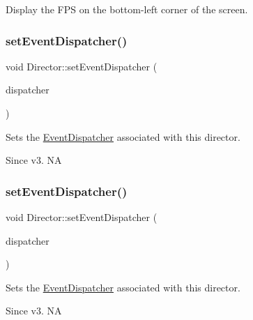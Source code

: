 Display the F\+PS on the bottom-\/left corner of the screen. \mbox{\label{classDirector_aaba36d4ea12402524b17755dc3b26b91}} 
\subsubsection{\texorpdfstring{set\+Event\+Dispatcher()}{setEventDispatcher()}\hspace{0.1cm}{\footnotesize\ttfamily [1/2]}}
{\footnotesize\ttfamily void Director\+::set\+Event\+Dispatcher (\begin{DoxyParamCaption}\item[{\hyperlink{classEventDispatcher}{Event\+Dispatcher} $\ast$}]{dispatcher }\end{DoxyParamCaption})}

Sets the \hyperlink{classEventDispatcher}{Event\+Dispatcher} associated with this director. \begin{DoxySince}{Since}
v3.  NA 
\end{DoxySince}
\mbox{\label{classDirector_aaba36d4ea12402524b17755dc3b26b91}} 
\subsubsection{\texorpdfstring{set\+Event\+Dispatcher()}{setEventDispatcher()}\hspace{0.1cm}{\footnotesize\ttfamily [2/2]}}
{\footnotesize\ttfamily void Director\+::set\+Event\+Dispatcher (\begin{DoxyParamCaption}\item[{\hyperlink{classEventDispatcher}{Event\+Dispatcher} $\ast$}]{dispatcher }\end{DoxyParamCaption})}

Sets the \hyperlink{classEventDispatcher}{Event\+Dispatcher} associated with this director. \begin{DoxySince}{Since}
v3.  NA 
\end{DoxySince}
\mbox{\label{classDirector_a7271f672c2afb904023fe0510fbe215f}} 
